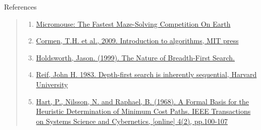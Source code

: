 \documentclass{amsart}
\begin{document}
\begin{section}{References}

    \begin{quote}
        \begin{enumerate}
            \item \href{https://www.youtube.com/watch?v=ZMQbHMgK2rw}{Micromouse: The Fastest Maze-Solving Competition On Earth}
            \item \href{https://dahlan.unimal.ac.id/files/ebooks/2009%20Introduction%20to%20Algorithms%20Third%20Ed.pdf}{Cormen, T.H. et al., 2009. Introduction to algorithms, MIT press}
            \item \href{https://www.researchgate.net/profile/Jason-Holdsworth/publication/2727226_The_Nature_of_Breadth-First_Search/links/5539d8d70cf2239f4e7dad9d/The-Nature-of-Breadth-First-Search.pdf}{Holdsworth, Jason. (1999). The Nature of Breadth-First Search. }
            \item \href{https://users.cs.duke.edu/~reif/paper/dfs.ptime.pdf}{Reif, John H. 1983. Depth-first search is inherently sequential, Harvard University}
            \item \href{https://ieeexplore.ieee.org/document/4082128}{Hart, P., Nilsson, N. and Raphael, B. (1968). A Formal Basis for the Heuristic Determination of Minimum Cost Paths. IEEE Transactions on Systems Science and Cybernetics, [online] 4(2), pp.100-107}

        \end{enumerate}
    \end{quote}
    
\end{section}
\end{document}
